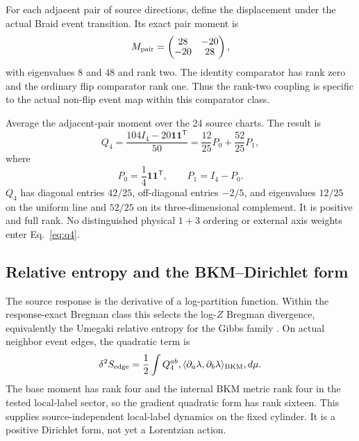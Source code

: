 \documentclass[11pt]{article}
\theoremstyle{definition}
\theoremstyle{remark}
\begin{document}
For each adjacent pair of source directions, define the displacement under the actual Braid event transition. Its exact pair moment is
\begin{equation}
 M_{\rm pair}=
 \begin{pmatrix}
 28&-20\\[-0.15em]
 -20&28
 \end{pmatrix},
\end{equation}
with eigenvalues $8$ and $48$ and rank two. The identity comparator has rank zero and the ordinary flip comparator rank one. Thus the rank-two coupling is specific to the actual non-flip event map within this comparator class.

Average the adjacent-pair moment over the 24 source charts. The result is
\begin{equation}\label{eq:q4}
 Q_4=\frac{104I_4-20\mathbf1\mathbf1^{\mathsf T}}{50}
 =\frac{12}{25}P_0+\frac{52}{25}P_1,
\end{equation}
where
\begin{equation}
 P_0=\frac14\mathbf1\mathbf1^{\mathsf T},\qquad
 P_1=I_4-P_0.
\end{equation}
$Q_4$ has diagonal entries $42/25$, off-diagonal entries $-2/5$, and eigenvalues $12/25$ on the uniform line and $52/25$ on its three-dimensional complement. It is positive and full rank. No distinguished physical $1+3$ ordering or external axis weights enter Eq.~\eqref{eq:q4}.

\subsection{Relative entropy and the BKM--Dirichlet form}

The source response is the derivative of a log-partition function. Within the response-exact Bregman class this selects the log-$Z$ Bregman divergence, equivalently the Umegaki relative entropy for the Gibbs family \cite{umegaki1962,amari2016}. On actual neighbor event edges, the quadratic term is
\begin{equation}\label{eq:bkm}
 \delta^2 S_{\rm edge}
 =\frac12\int Q_4^{ab},
 \langle \partial_a\lambda,\partial_b\lambda\rangle_{\rm BKM},d\mu.
\end{equation}
The base moment has rank four and the internal BKM metric rank four in the tested local-label sector, so the gradient quadratic form has rank sixteen. This supplies source-independent local-label dynamics on the fixed cylinder. It is a positive Dirichlet form, not yet a Lorentzian action.
\end{document}

